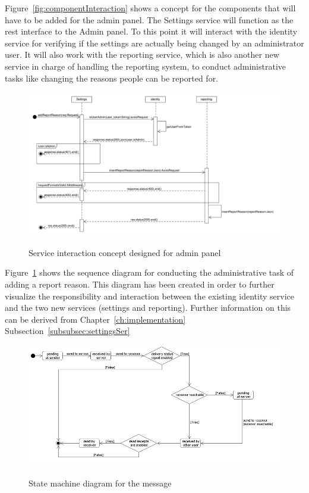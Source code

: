 Figure~\ref{fig:componentInteraction} shows a concept for the components that will have to be added for the admin panel. The Settings service will function as the rest interface to the Admin panel. To this point it will interact with the identity service for verifying if the settings are actually being changed by an administrator user. It will also work with the reporting service, which is also another new service in charge of handling the reporting system, to conduct administrative tasks like changing the reasons people can be reported for. 

\begin{figure}[h]
	\centering
	\caption{Service interaction concept designed for admin panel}
	\includegraphics[width=1.0\textwidth]{./images/SequenceDiagram_AddReportReason.pdf}
	\label{fig:sequenceDiagramAddReportReason}
\end{figure}

Figure~\ref{fig:sequenceDiagramAddReportReason} shows the sequence diagram for conducting the administrative task of adding a report reason. This diagram has been created in order to further visualize the responsibility and interaction between the existing identity service and the two new services (settings and reporting). Further information on this can be derived from Chapter~\ref{ch:implementation} Subsection~\ref{subsubsec:settingsSer}

\begin{figure}[h]
	\centering
	\caption{State machine diagram for the message}
	\includegraphics[width=1.0\textwidth]{./images/stateMachineMessage.png}
	\label{fig:stateMachineMessage}
\end{figure}

